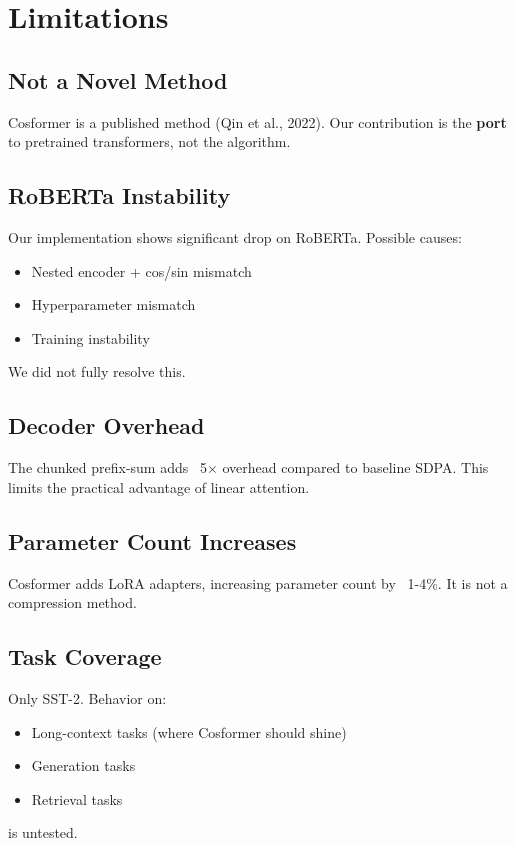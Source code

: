 
\section{Limitations}

\subsection{Not a Novel Method}

Cosformer is a published method (Qin et al., 2022). Our contribution is 
the \textbf{port} to pretrained transformers, not the algorithm.

\subsection{RoBERTa Instability}

Our implementation shows significant drop on RoBERTa. Possible causes:
\begin{itemize}
\item Nested encoder + cos/sin mismatch
\item Hyperparameter mismatch
\item Training instability

\end{itemize}
We did not fully resolve this.

\subsection{Decoder Overhead}

The chunked prefix-sum adds ~5$\times$ overhead compared to baseline SDPA. This 
limits the practical advantage of linear attention.

\subsection{Parameter Count Increases}

Cosformer adds LoRA adapters, increasing parameter count by ~1-4\%. It is 
not a compression method.

\subsection{Task Coverage}

Only SST-2. Behavior on:
\begin{itemize}
\item Long-context tasks (where Cosformer should shine)
\item Generation tasks
\item Retrieval tasks
\end{itemize}
is untested.

